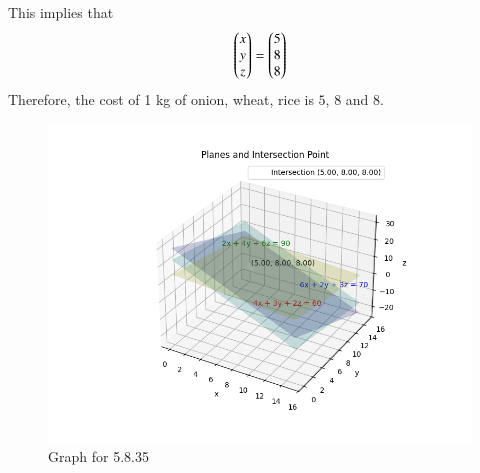 \documentclass[journal,12pt,onecolumn]{IEEEtran}
\theoremstyle{remark}
\begin{document}
This implies that 
\begin{align}
    \begin{pmatrix}x \\ y\\ z\end{pmatrix}=\begin{pmatrix}5 \\ 8 \\ 8\end{pmatrix}
\end{align}
Therefore, the cost of 1 kg of onion, wheat, rice is \rupee $5$, \rupee $8$ and \rupee $8$.
\begin{figure}[H]
    \centering
    \includegraphics[width=1\columnwidth]{figs/1.png}
    \caption{Graph for 5.8.35}
    \label{fig:placeholder}
\end{figure}
\end{document}
